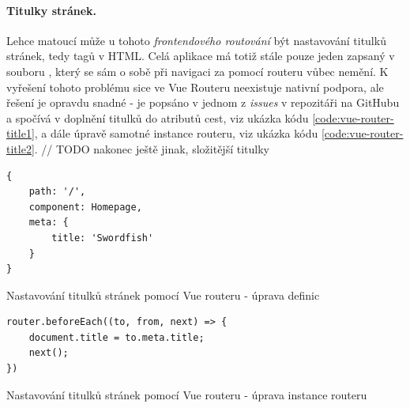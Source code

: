 

% 
% 
% 
% 
% 

\paragraph{Titulky stránek.} Lehce matoucí může u tohoto \emph{frontendového routování} být nastavování titulků stránek, tedy  tagů v HTML. Celá aplikace má totiž stále pouze jeden  zapsaný v souboru , který se sám o sobě při navigaci za pomocí routeru vůbec nemění. K vyřešení tohoto problému sice ve Vue Routeru neexistuje nativní podpora, ale řešení je opravdu snadné - je popsáno v jednom z \emph{issues} v repozitáři na GitHubu \cite{vue-router-title} a spočívá v doplnění titulků do  atributů cest, viz ukázka kódu \ref{code:vue-router-title1}, a dále úpravě samotné instance routeru, viz ukázka kódu \ref{code:vue-router-title2}. // TODO nakonec ještě jinak, složitější titulky

\begin{listing}[]
\begin{verbatim}
{
    path: '/',
    component: Homepage,
    meta: {
        title: 'Swordfish'
    }
}
\end{verbatim}
\caption{Nastavování titulků stránek pomocí Vue routeru - úprava definic} \label{code:vue-router-title1}
\end{listing}

\begin{listing}[]
    \begin{verbatim}
router.beforeEach((to, from, next) => {
    document.title = to.meta.title;
    next();
})
\end{verbatim}
\caption{Nastavování titulků stránek pomocí Vue routeru - úprava instance routeru} \label{code:vue-router-title2}
\end{listing}

